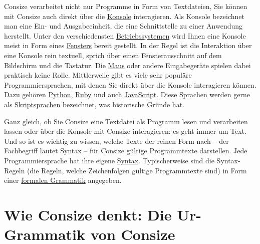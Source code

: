 Consize verarbeitet nicht nur Programme in Form von Textdateien, Sie können mit Consize auch direkt über die \href{http://de.wikipedia.org/wiki/Kommandozeile}{Konsole} interagieren. Als Konsole bezeichnet man eine Ein- und Ausgabeeinheit, die eine Schnittstelle zu einer Anwendung herstellt. Unter den verschiedensten \href{http://de.wikipedia.org/wiki/Betriebssystem}{Betriebssystemen} wird Ihnen eine Konsole meist in Form eines \href{http://de.wikipedia.org/wiki/Fenster\_(Computer)}{Fensters} bereit gestellt. In der Regel ist die Interaktion über eine Konsole rein textuell, sprich über einen Fensterausschnitt auf dem Bildschirm und die Tastatur. Die \href{http://de.wikipedia.org/wiki/Computermaus}{Maus} oder andere Eingabegeräte spielen dabei praktisch keine Rolle. Mittlerweile gibt es viele sehr populäre Programmiersprachen, mit denen Sie direkt über die Konsole interagieren können. Dazu gehören \href{http://de.wikipedia.org/wiki/Python\_(Programmiersprache)}{Python}, \href{http://de.wikipedia.org/wiki/Ruby\_(Programmiersprache)}{Ruby} und auch \href{http://de.wikipedia.org/wiki/JavaScript}{JavaScript}. Diese Sprachen werden gerne als \href{http://de.wikipedia.org/wiki/Skriptsprache}{Skriptsprachen} bezeichnet, was historische Gründe hat.

Ganz gleich, ob Sie Consize eine Textdatei als Programm lesen und verarbeiten lassen oder über die Konsole mit Consize interagieren: es geht immer um Text. Und so ist es wichtig zu wissen, welche Texte der reinen Form nach -- der Fachbegriff lautet Syntax -- für Consize gültige Programmtexte darstellen. Jede Programmiersprache hat ihre eigene \href{http://de.wikipedia.org/wiki/Syntax#Die\_Syntax\_formaler\_Sprachen\_.28formale\_Syntax.29}{Syntax}. Typischerweise sind die Syntax-Regeln (die Regeln, welche Zeichenfolgen gültige Programmtexte sind) in Form einer \href{http://de.wikipedia.org/wiki/Formale\_Grammatik}{formalen Grammatik} angegeben.

\section{Wie Consize denkt: Die Ur-Grammatik von Consize}
\label{Sec:UrGrammatik}


